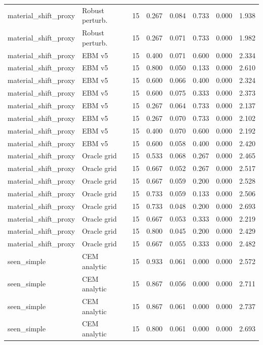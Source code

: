 {\begin{longtable}{llrrrrrr}
material\_shift\_proxy & Robust perturb. & 15 & 0.267 & 0.084 & 0.733 & 0.000 & 1.938 \\
material\_shift\_proxy & Robust perturb. & 15 & 0.267 & 0.071 & 0.733 & 0.000 & 1.982 \\
material\_shift\_proxy & EBM v5 & 15 & 0.400 & 0.071 & 0.600 & 0.000 & 2.334 \\
material\_shift\_proxy & EBM v5 & 15 & 0.800 & 0.050 & 0.133 & 0.000 & 2.610 \\
material\_shift\_proxy & EBM v5 & 15 & 0.600 & 0.066 & 0.400 & 0.000 & 2.324 \\
material\_shift\_proxy & EBM v5 & 15 & 0.600 & 0.075 & 0.333 & 0.000 & 2.373 \\
material\_shift\_proxy & EBM v5 & 15 & 0.267 & 0.064 & 0.733 & 0.000 & 2.137 \\
material\_shift\_proxy & EBM v5 & 15 & 0.267 & 0.070 & 0.733 & 0.000 & 2.102 \\
material\_shift\_proxy & EBM v5 & 15 & 0.400 & 0.070 & 0.600 & 0.000 & 2.192 \\
material\_shift\_proxy & EBM v5 & 15 & 0.600 & 0.058 & 0.400 & 0.000 & 2.420 \\
material\_shift\_proxy & Oracle grid & 15 & 0.533 & 0.068 & 0.267 & 0.000 & 2.465 \\
material\_shift\_proxy & Oracle grid & 15 & 0.667 & 0.052 & 0.267 & 0.000 & 2.517 \\
material\_shift\_proxy & Oracle grid & 15 & 0.667 & 0.059 & 0.200 & 0.000 & 2.528 \\
material\_shift\_proxy & Oracle grid & 15 & 0.733 & 0.059 & 0.133 & 0.000 & 2.506 \\
material\_shift\_proxy & Oracle grid & 15 & 0.733 & 0.048 & 0.200 & 0.000 & 2.693 \\
material\_shift\_proxy & Oracle grid & 15 & 0.667 & 0.053 & 0.333 & 0.000 & 2.219 \\
material\_shift\_proxy & Oracle grid & 15 & 0.800 & 0.045 & 0.200 & 0.000 & 2.429 \\
material\_shift\_proxy & Oracle grid & 15 & 0.667 & 0.055 & 0.333 & 0.000 & 2.482 \\
seen\_simple & CEM analytic & 15 & 0.933 & 0.061 & 0.000 & 0.000 & 2.572 \\
seen\_simple & CEM analytic & 15 & 0.867 & 0.056 & 0.000 & 0.000 & 2.711 \\
seen\_simple & CEM analytic & 15 & 0.867 & 0.061 & 0.000 & 0.000 & 2.737 \\
seen\_simple & CEM analytic & 15 & 0.800 & 0.061 & 0.000 & 0.000 & 2.693 \\

\end{longtable}}
